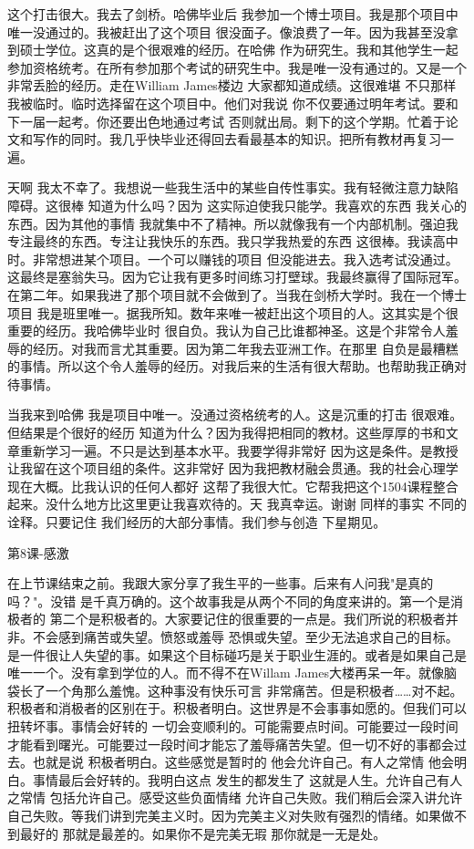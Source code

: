 这个打击很大。我去了剑桥。哈佛毕业后 我参加一个博士项目。我是那个项目中唯一没通过的。我被赶出了这个项目 很没面子。像浪费了一年。因为我甚至没拿到硕士学位。这真的是个很艰难的经历。在哈佛 作为研究生。我和其他学生一起 参加资格统考。在所有参加那个考试的研究生中。我是唯一没有通过的。又是一个非常丢脸的经历。走在William James楼边 大家都知道成绩。这很难堪 不只那样 我被临时。临时选择留在这个项目中。他们对我说 你不仅要通过明年考试。要和下一届一起考。你还要出色地通过考试 否则就出局。剩下的这个学期。忙着于论文和写作的同时。我几乎快毕业还得回去看最基本的知识。把所有教材再复习一遍。 

天啊 我太不幸了。我想说一些我生活中的某些自传性事实。我有轻微注意力缺陷障碍。这很棒 知道为什么吗？因为 这实际迫使我只能学。我喜欢的东西 我关心的东西。因为其他的事情 我就集中不了精神。所以就像我有一个内部机制。强迫我专注最终的东西。专注让我快乐的东西。我只学我热爱的东西 这很棒。我读高中时。非常想进某个项目。一个可以赚钱的项目 但没能进去。我入选考试没通过。这最终是塞翁失马。因为它让我有更多时间练习打壁球。我最终赢得了国际冠军。在第二年。如果我进了那个项目就不会做到了。当我在剑桥大学时。我在一个博士项目 我是班里唯一。据我所知。数年来唯一被赶出这个项目的人。这其实是个很重要的经历。我哈佛毕业时 很自负。我认为自己比谁都神圣。这是个非常令人羞辱的经历。对我而言尤其重要。因为第二年我去亚洲工作。在那里 自负是最糟糕的事情。所以这个令人羞辱的经历。对我后来的生活有很大帮助。也帮助我正确对待事情。 

当我来到哈佛 我是项目中唯一。没通过资格统考的人。这是沉重的打击 很艰难。但结果是个很好的经历 知道为什么？因为我得把相同的教材。这些厚厚的书和文章重新学习一遍。不只是达到基本水平。我要学得非常好 因为这是条件。是教授让我留在这个项目组的条件。这非常好 因为我把教材融会贯通。我的社会心理学 现在大概。比我认识的任何人都好 这帮了我很大忙。它帮我把这个1504课程整合起来。没什么地方比这里更让我喜欢待的。天 我真幸运。谢谢 同样的事实 不同的诠释。只要记住 我们经历的大部分事情。我们参与创造 下星期见。 

第8课-感激 

在上节课结束之前。我跟大家分享了我生平的一些事。后来有人问我"是真的吗？"。没错 是千真万确的。这个故事我是从两个不同的角度来讲的。第一个是消极者的 第二个是积极者的。大家要记住的很重要的一点是。我们所说的积极者并非。不会感到痛苦或失望。愤怒或羞辱 恐惧或失望。至少无法追求自己的目标。是一件很让人失望的事。如果这个目标碰巧是关于职业生涯的。或者是如果自己是唯一一个。没有拿到学位的人。而不得不在Willam James大楼再呆一年。就像脑袋长了一个角那么羞愧。这种事没有快乐可言 非常痛苦。但是积极者……对不起。积极者和消极者的区别在于。积极者明白。这世界是不会事事如愿的。但我们可以扭转坏事。事情会好转的 一切会变顺利的。可能需要点时间。可能要过一段时间才能看到曙光。可能要过一段时间才能忘了羞辱痛苦失望。但一切不好的事都会过去。也就是说 积极者明白。这些感觉是暂时的 他会允许自己。有人之常情 他会明白。事情最后会好转的。我明白这点 发生的都发生了 这就是人生。允许自己有人之常情 包括允许自己。感受这些负面情绪 允许自己失败。我们稍后会深入讲允许自己失败。等我们讲到完美主义时。因为完美主义对失败有强烈的情绪。如果做不到最好的 那就是最差的。如果你不是完美无瑕 那你就是一无是处。 

